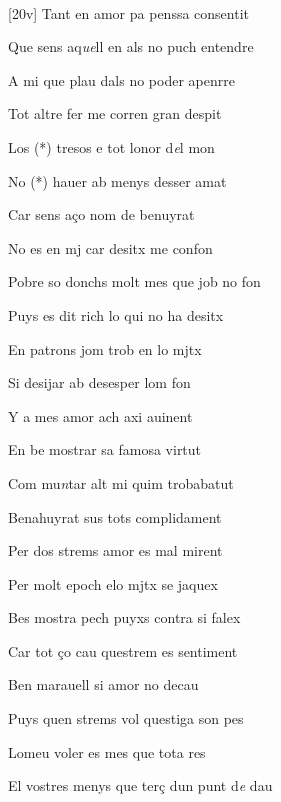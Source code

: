 \documentclass[12pt]{article}
\renewcommand{\espaiAbansEtiquetaPoema}{\vspace{0ex}}
\begin{document}
\begin{estrofa}

\espaiAbansEtiquetaPoema

\\

\end{estrofa}


\begin{estrofa}

 [20v] Tant en amor pa penssa consentit

 Que sens aq\textit{ue}ll en als no puch entendre

 A mi que plau dals no poder apenrre

 Tot altre fer me corren gran despit

 Los (*) tresos e tot lonor d\textit{e}l mon

 No (*) hauer ab menys desser amat

 Car sens a\c{c}o nom de benuyrat

 No es en mj car desitx me confon

\end{estrofa}



\begin{estrofa}

 Pobre so donchs molt mes que job no fon

 Puys es dit rich lo qui no ha desitx

 En patrons jom trob en lo mjtx

 Si desijar ab desesper lom fon

 Y a mes amor ach axi auinent

 En be mostrar sa famosa virtut

 Com mu\textit{n}tar alt mi quim trobabatut

 Benahuyrat sus tots complidament

\end{estrofa}



\begin{estrofa}

 Per dos strems amor es mal mirent

 Per molt epoch elo mjtx se jaquex

 Bes mostra pech puyxs contra si falex

 Car tot \c{c}o cau questrem es sentiment

 Ben marauell si amor no decau

 Puys quen strems vol questiga son pes

 Lomeu voler es mes que tota res

 El vostres menys que ter\c{c} dun punt d\textit{e} dau

\end{estrofa}
\end{document}
